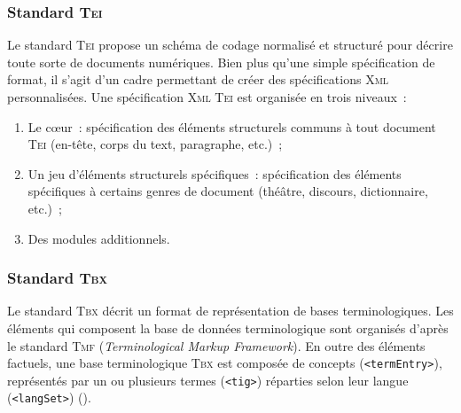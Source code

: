 
      \subsubsection{Standard \textsc{Tei}}
      \label{subsubsec:main-automatic_evaluation_of_keyphrase_annotation-methodology-data_format-tei}
        Le standard \textsc{Tei} propose un schéma de codage normalisé et
        structuré pour décrire toute sorte de documents numériques. Bien plus
        qu'une simple spécification de format, il s'agit d'un cadre permettant
        de créer des spécifications \textsc{Xml} personnalisées. Une
        spécification \textsc{Xml} \textsc{Tei} est organisée en trois niveaux~:
        \begin{enumerate}
          \item{Le c\oe{}ur~: spécification des éléments structurels communs à
                tout document \textsc{Tei} (en-tête, corps du text, paragraphe,
                etc.)~;}
          \item{Un jeu d'éléments structurels spécifiques~: spécification des
                éléments spécifiques à certains genres de document (théâtre,
                discours, dictionnaire, etc.)~;}
          \item{Des modules additionnels.}
        \end{enumerate}


      \subsubsection{Standard \textsc{Tbx}}
      \label{subsubsec:main-automatic_evaluation_of_keyphrase_annotation-methodology-data_format-tbx}
        Le standard \textsc{Tbx} décrit un format de représentation de bases
        terminologiques. Les éléments qui composent la base de données
        terminologique sont organisés d'après le standard \textsc{Tmf}
        (\textit{Terminological Markup Framework}). En outre des éléments
        factuels, une base terminologique \textsc{Tbx} est composée de concepts
        (\texttt{<termEntry>}), représentés par un ou plusieurs termes
        (\texttt{<tig>}) réparties selon leur langue (\texttt{<langSet>})
        ().

        \TODO{\dots}


